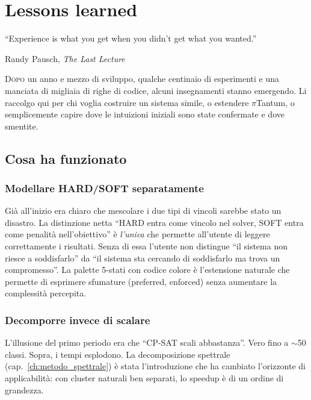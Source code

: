 \chapter{Lessons learned}
\label{ch:lessons_learned}


\epigraph{``Experience is what you get when you didn't get
what you wanted.''}{Randy Pausch, \emph{The Last Lecture}}

\lettrine[lines=3]{D}{opo} un anno e mezzo di sviluppo,
qualche centinaio di esperimenti e una manciata di migliaia
di righe di codice, alcuni insegnamenti stanno emergendo. Li
raccolgo qui per chi voglia costruire un sistema simile, o
estendere $\pi$Tantum, o semplicemente capire dove le
intuizioni iniziali sono state confermate e dove smentite.

\section{Cosa ha funzionato}

\subsection{Modellare HARD/SOFT separatamente}

Gi\`a all'inizio era chiaro che mescolare i due tipi di
vincoli sarebbe stato un disastro. La distinzione netta
``HARD entra come vincolo nel solver, SOFT entra come
penalit\`a nell'obiettivo'' \`e \emph{l'unica} che permette
all'utente di leggere correttamente i risultati. Senza di
essa l'utente non distingue ``il sistema non riesce a
soddisfarlo'' da ``il sistema sta cercando di soddisfarlo
ma trova un compromesso''. La palette 5-stati con codice
colore \`e l'estensione naturale che permette di esprimere
sfumature (preferred, enforced) senza aumentare la
complessit\`a percepita.

\subsection{Decomporre invece di scalare}

L'illusione del primo periodo era che ``CP-SAT scali
abbastanza''. Vero fino a $\sim$50 classi. Sopra, i tempi
esplodono. La decomposizione spettrale (cap.~\ref{ch:metodo_spettrale})
\`e stata l'introduzione che ha cambiato l'orizzonte di
applicabilit\`a: con cluster naturali ben separati, lo
speedup \`e di un ordine di grandezza.

